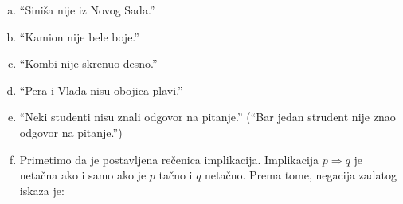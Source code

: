 \begin{enumerate}[(a)]
\item \enquote{Sini\v sa nije iz Novog Sada.}
\item \enquote{Kamion nije bele boje.}
\item \enquote{Kombi nije skrenuo desno.}
\item \enquote{Pera i Vlada nisu obojica plavi.}
\item \enquote{Neki studenti nisu znali odgovor na pitanje.} (\enquote{Bar jedan strudent nije znao odgovor na pitanje.})
\item Primetimo da je postavljena re\v cenica implikacija. Implikacija $p\Rightarrow q$ je neta\v cna ako i samo ako je $p$ ta\v cno i $q$ neta\v cno. Prema tome, negacija zadatog iskaza je:

\end{enumerate}

